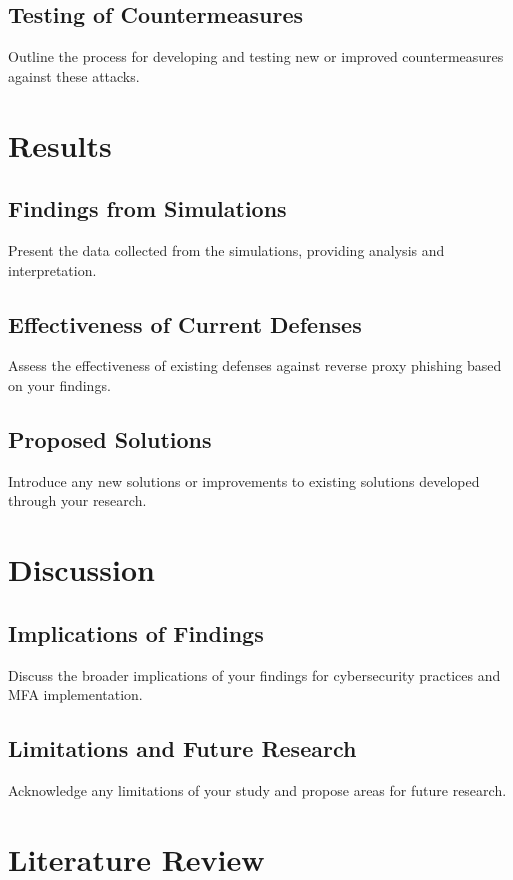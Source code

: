 \documentclass [14pt]{extarticle}
\begin{document}
\subsection{Testing of Countermeasures}
Outline the process for developing and testing new or improved countermeasures against these attacks.

\section{Results}
\subsection{Findings from Simulations}
Present the data collected from the simulations, providing analysis and interpretation.
\subsection{Effectiveness of Current Defenses}
Assess the effectiveness of existing defenses against reverse proxy phishing based on your findings.
\subsection{Proposed Solutions}
Introduce any new solutions or improvements to existing solutions developed through your research.

\section{Discussion}
\subsection{Implications of Findings}
Discuss the broader implications of your findings for cybersecurity practices and MFA implementation.
\subsection{Limitations and Future Research}
Acknowledge any limitations of your study and propose areas for future research.

\newpage
\section{Literature Review}
\end{document}
